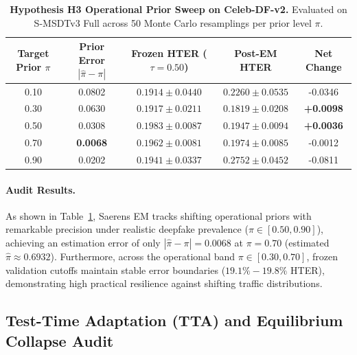 \begin{table}[t]
\centering
\small
\caption{\textbf{Hypothesis H3 Operational Prior Sweep on Celeb-DF-v2.} Evaluated on S-MSDTv3 Full across 50 Monte Carlo resamplings per prior level $\pi$.}
\label{tab:h3_prior}
\begin{tabular}{c c c c c}
\toprule
\textbf{Target Prior $\pi$} & \textbf{Prior Error $|\hat{\pi} - \pi|$} & \textbf{Frozen HTER ($\tau=0.50$)} & \textbf{Post-EM HTER} & \textbf{Net Change} \\
\midrule
0.10 & 0.0802 & $0.1914 \pm 0.0440$ & $0.2260 \pm 0.0535$ & -0.0346 \\
0.30 & 0.0630 & $0.1917 \pm 0.0211$ & $\mathbf{0.1819 \pm 0.0208}$ & \textbf{+0.0098} \\
0.50 & 0.0308 & $0.1983 \pm 0.0087$ & $\mathbf{0.1947 \pm 0.0094}$ & \textbf{+0.0036} \\
0.70 & \textbf{0.0068} & $0.1962 \pm 0.0081$ & $0.1974 \pm 0.0085$ & -0.0012 \\
0.90 & 0.0202 & $0.1941 \pm 0.0337$ & $0.2752 \pm 0.0452$ & -0.0811 \\
\bottomrule
\end{tabular}
\end{table}

\paragraph{Audit Results.}
As shown in Table~\ref{tab:h3_prior}, Saerens EM tracks shifting operational priors with remarkable precision under realistic deepfake prevalence ($\pi \in [0.50, 0.90]$), achieving an estimation error of only $|\hat{\pi} - \pi| = \mathbf{0.0068}$ at $\pi = 0.70$ (estimated $\hat{\pi} \approx 0.6932$). Furthermore, across the operational band $\pi \in [0.30, 0.70]$, frozen validation cutoffs maintain stable error boundaries ($19.1\% - 19.8\%$ HTER), demonstrating high practical resilience against shifting traffic distributions.

\subsection{Test-Time Adaptation (TTA) and Equilibrium Collapse Audit}
\label{sec:tta_audit}
